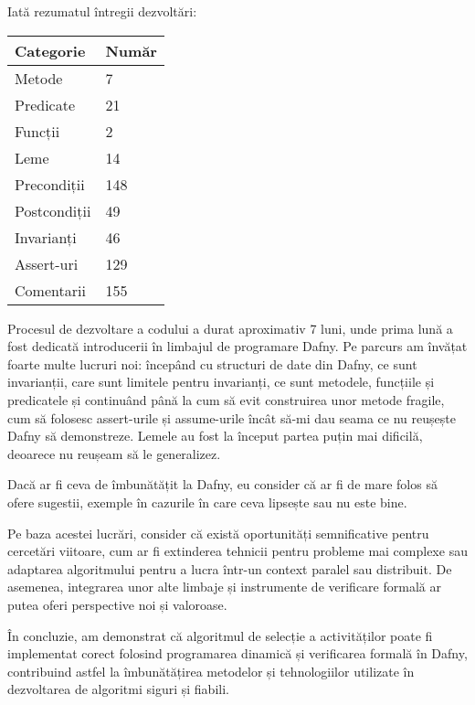Iată rezumatul întregii dezvoltări:
\begin{table}[h!]
\centering
\begin{tabular}{>{\raggedright}p{7cm} p{3cm}}
    \textbf{Categorie} & \textbf{Număr} \\
    \midrule
    Metode & 7 \\
    Predicate & 21 \\
    Funcții & 2 \\
    Leme & 14 \\
    Precondiții & 148 \\
    Postcondiții & 49 \\
    Invarianți & 46 \\
    Assert-uri & 129 \\
    Comentarii & 155 \\
\end{tabular}
\end{table}

Procesul de dezvoltare a codului a durat aproximativ 7 luni, unde prima lună a fost dedicată introducerii în limbajul de programare Dafny. 
Pe parcurs am învățat foarte multe lucruri noi: începând cu structuri de date din Dafny, ce sunt invarianții, care sunt limitele pentru invarianți, ce sunt metodele, funcțiile și predicatele și continuând până la cum să evit construirea unor metode fragile, cum să folosesc assert-urile și assume-urile încât să-mi dau seama ce nu reușește Dafny să demonstreze. Lemele au fost la început partea puțin mai dificilă, deoarece nu reușeam să le generalizez.

Dacă ar fi ceva de îmbunătățit la Dafny, eu consider că ar fi de mare folos să ofere sugestii, exemple în cazurile în care ceva lipsește sau nu este bine.   

Pe baza acestei lucrări, consider că există oportunități semnificative pentru cercetări viitoare, cum ar fi extinderea tehnicii pentru probleme mai complexe sau adaptarea algoritmului pentru a lucra într-un context paralel sau distribuit. De asemenea, integrarea unor alte limbaje și instrumente de verificare formală ar putea oferi perspective noi și valoroase.

În concluzie, am demonstrat că algoritmul de selecție a activităților poate fi implementat corect folosind programarea dinamică și verificarea formală în Dafny, contribuind astfel la îmbunătățirea metodelor și tehnologiilor utilizate în dezvoltarea de algoritmi siguri și fiabili.